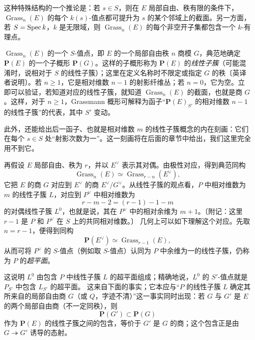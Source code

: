 这种特殊结构的一个推论是：若 $s\in S$，则在 $E$ 局部自由、秩有限的条件下，$\operatorname{Grass}_n(E)$ 的每个 $k(s)$-值点都可提升为 $s$ 的某个邻域上的截面。另一方面，若 $S=\operatorname{Spec} k$，$k$ 是无限域，则 $\operatorname{Grass}_n(E)$ 的每个非空开子集都包含一个 $k$-有理点。

$\operatorname{Grass}_n(E)$ 的一个 $S$-值点，即 $E$ 的一个局部自由秩 $n$ 商模 $G$，典范地确定 $\mathbf P(E)$ 的一个子概形 $\mathbf P(G)$。这样的子概形称为 $\mathbf P(E)$ 的\emph{线性子簇}（可能混淆时，说相对于 $S$ 的线性子簇）；这里在定义名称时不限定或指定 $G$ 的秩〔英译者说明〕。若 $n\geq1$，它是相对维数 $n-1$ 的射影纤维丛；若 $n=0$，它为空。立即可以验证，若知道对应的线性子簇，就知道 $\operatorname{Grass}_n(E)$ 的截面，也就是商 $G$。这样，对于 $n\geq1$，Grassmann 概形可解释为函子“$\mathbf P(E)_{S'}$ 的相对维数 $n-1$ 的线性子簇”的代表，其中 $S'$ 变动。

此外，还能给出后一函子、也就是相对维数 $m$ 的线性子簇概念的内在刻画：它们在每个 $s\in S$ 处“射影次数为一”。这一刻画将在后面的章节中给出，我们这里完全用不到它。

再假设 $E$ 局部自由、秩为 $r$，并以 $E^\vee$ 表示其对偶。由极性对应，得到典范同构
\[
\operatorname{Grass}_n(E)\simeq
\operatorname{Grass}_{r-n}(E^\vee),
\]
它把 $E$ 的商 $G$ 对应到 $E^\vee$ 的商 $E^\vee/G^\vee$。从线性子簇的观点看，$P$ 中相对维数为 $m$ 的线性子簇 $L$，对应到 $P^\vee$ 中相对维数为
\[
r-m-2=(r-1)-1-m
\]
的对偶线性子簇 $L^0$，也就是说，其在 $P^\vee$ 中的相对余维为 $m+1$。〔附记：这里 $r-1$ 是 $P$ 和 $P^\vee$ 在 $S$ 上的共同相对维数。〕
几何上可以如下理解这个对应。先取 $n=r-1$，便得到同构
\[
\mathbf P(E^\vee)\simeq\operatorname{Grass}_{r-1}(E),
\]
从而可将 $P^\vee$ 的 $S$-值点（例如取 $S$-值点）认同为 $P$ 中余维为一的线性子簇，仍称为 $P$ 的\emph{超平面}。

这说明 $L^0$ 由包含 $P$ 中线性子簇 $L$ 的超平面组成；精确地说，$L^0$ 的 $S'$-值点就是 $P_{S'}$ 中包含 $L_{S'}$ 的超平面。
这来自下面的事实；它本应与“$P$ 的线性子簇 $L$ 确定其所来自的局部自由商 $G$（或 $Q$，字迹不清）”这一事实同时出现：若 $G$ 与 $G'$ 是 $E$ 的两个局部自由商（不一定同秩），则
\[
\mathbf P(G')\subset\mathbf P(G)
\]
作为 $\mathbf P(E)$ 的线性子簇之间的包含，等价于 $G'$ 是 $G$ 的商；这个包含正是由 $G\twoheadrightarrow G'$ 诱导的态射。


